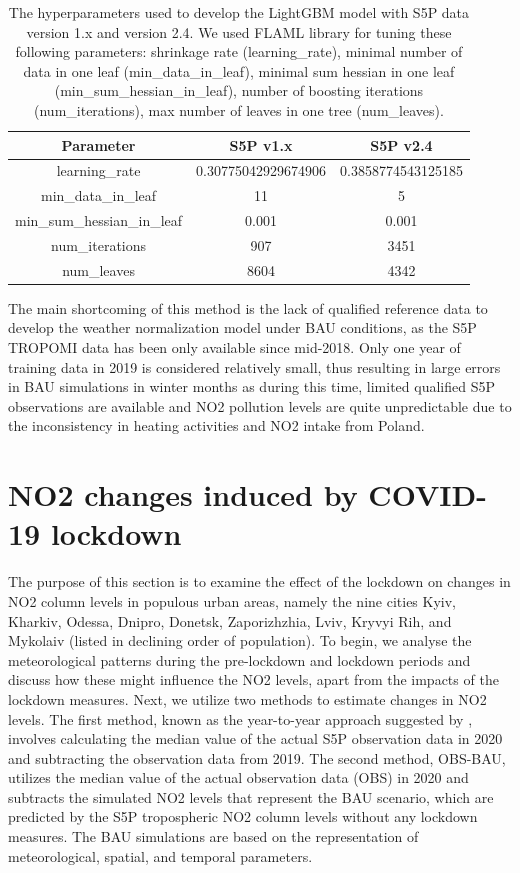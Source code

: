 \begin{table}[!ht]
    \centering
    \caption{The hyperparameters used to develop the LightGBM model with S5P data version 1.x and version 2.4. We used FLAML library \citep{wang2021flaml} for tuning these following parameters: shrinkage rate (learning\_rate), minimal number of data in one leaf (min\_data\_in\_leaf), minimal sum hessian in one leaf (min\_sum\_hessian\_in\_leaf), number of boosting iterations (num\_iterations), max number of leaves in one tree (num\_leaves).}
    \label{tab:tab1}
    \begin{tabular}{c c c}
        \hline
            Parameter & S5P v1.x & S5P v2.4  \\ \hline
            learning\_rate & 0.30775042929674906 & 0.3858774543125185  \\
            min\_data\_in\_leaf & 11 & 5  \\
            min\_sum\_hessian\_in\_leaf & 0.001 & 0.001  \\
            num\_iterations & 907 & 3451  \\
            num\_leaves & 8604 & 4342  \\ \hline
    \end{tabular}

\end{table}

The main shortcoming of this method is the lack of qualified reference data to develop the weather normalization model under BAU conditions, as the S5P TROPOMI data has been only available since mid-2018. Only one year of training data in 2019 is considered relatively small, thus resulting in large errors in BAU simulations in winter months as during this time, limited qualified S5P observations are available and NO2 pollution levels are quite unpredictable due to the inconsistency in heating activities and NO2 intake from Poland.\par
\section{NO2 changes induced by COVID-19 lockdown} \label{chap3_covid}
The purpose of this section is to examine the effect of the lockdown on changes in NO2 column levels in populous urban areas, namely the nine cities Kyiv, Kharkiv, Odessa, Dnipro, Donetsk, Zaporizhzhia, Lviv, Kryvyi Rih, and Mykolaiv (listed in declining order of population). To begin, we analyse the meteorological patterns during the pre-lockdown and lockdown periods and discuss how these might influence the NO2 levels, apart from the impacts of the lockdown measures. Next, we utilize two methods to estimate changes in NO2 levels. The first method, known as the year-to-year approach suggested by \citep{barre2021estimating}, involves calculating the median value of the actual S5P observation data in 2020 and subtracting the observation data from 2019. The second method, OBS-BAU, utilizes the median value of the actual observation data (OBS) in 2020 and subtracts the simulated NO2 levels that represent the BAU scenario, which are predicted by the S5P tropospheric NO2 column levels without any lockdown measures. The BAU simulations are based on the representation of meteorological, spatial, and temporal parameters. \par
